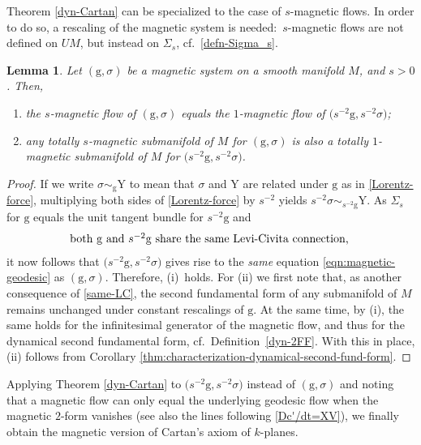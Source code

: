 \documentclass[pdftex]{sigma}
\newcommand{\g}{\mathrm{g}}
\newcommand{\Y}{\mathrm{Y}}
\numberwithin{equation}{section}
\newtheorem{Lemma}[Theorem]{Lemma}
\theoremstyle{definition}
\begin{document}
Theorem \ref{dyn-Cartan} can be specialized to the case of $s$-magnetic flows. In order to do so, a rescaling of the magnetic system is needed:\ $s$-magnetic flows are not defined on $UM$, but instead on $\Sigma_s$, cf.\ \eqref{defn-Sigma_s}.

\begin{Lemma} \label{lem:reduction}
Let $(\g,\sigma)$ be a magnetic system on a smooth manifold $M$, and $s>0$. Then,
\begin{enumerate}[\normalfont(i)]\itemsep=0pt
 \item the $s$-magnetic flow of $(\g,\sigma)$ equals the $1$-magnetic flow of $\bigl(s^{-2}\g,s^{-2}\sigma\bigr)$;
 \item any totally $s$-magnetic submanifold of $M$ for $(\g,\sigma)$ is also a totally \mbox{$1$-mag\-ne\-tic} submanifold of $M$ for $\bigl(s^{-2}\g,s^{-2}\sigma\bigr)$.
\end{enumerate}
\end{Lemma}

 \begin{proof}
 If we write $\sigma \sim_{\g} \Y$ to mean that $\sigma$ and $\Y$ are related under $\g$ as in \eqref{Lorentz-force}, multiplying both sides of \eqref{Lorentz-force} by $s^{-2}$ yields $s^{-2}\sigma \sim_{s^{-2}\g} \Y$. As $\Sigma_s$ for $\g$ equals the unit tangent bundle for $s^{-2}\g$ and \begin{equation}\label{same-LC} \parbox{.72\textwidth}{both $\g$ and $s^{-2}\g$ share the same Levi-Civita connection,}\end{equation} it now follows that $\bigl(s^{-2}\g,s^{-2}\sigma\bigr)$ gives rise to the \emph{same} equation \eqref{eqn:magnetic-geodesic} as $(\g,\sigma)$. Therefore, (i)~holds. For (ii) we first note that, as another consequence of \eqref{same-LC}, the second fundamental form of any submanifold of $M$ remains unchanged under constant rescalings of $\g$. At the same time, by (i), the same holds for the infinitesimal generator of the magnetic flow, and thus for the dynamical second fundamental form, cf.\ Definition~\ref{dyn-2FF}. With this in place, (ii) follows from Corollary \ref{thm:characterization-dynamical-second-fund-form}.
 \end{proof}

Applying Theorem \ref{dyn-Cartan} to $\bigl(s^{-2}\g,s^{-2}\sigma\bigr)$ instead of $(\g,\sigma)$ and noting that a magnetic flow can only equal the underlying geodesic flow when the magnetic $2$-form vanishes (see also the lines following \eqref{Dc'/dt=XV}), we finally obtain the magnetic version of Cartan's axiom of $k$-planes.
\end{document}
